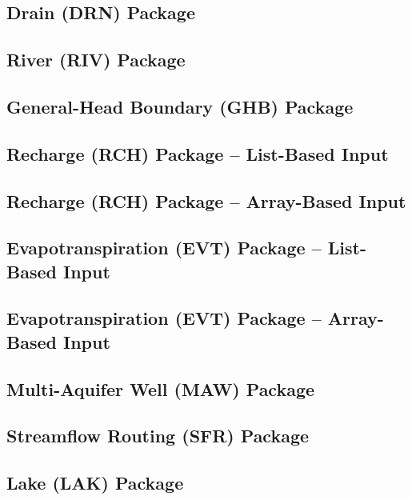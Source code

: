 \newpage
\subsection{Drain (DRN) Package}


\newpage
\subsection{River (RIV) Package}


\newpage
\subsection{General-Head Boundary (GHB) Package}


\newpage
\subsection{Recharge (RCH) Package -- List-Based Input}


\newpage
\subsection{Recharge (RCH) Package -- Array-Based Input}


\newpage
\subsection{Evapotranspiration (EVT) Package -- List-Based Input}


\newpage
\subsection{Evapotranspiration (EVT) Package -- Array-Based Input}


\newpage
\subsection{Multi-Aquifer Well (MAW) Package}


\newpage
\subsection{Streamflow Routing (SFR) Package}


\newpage
\subsection{Lake (LAK) Package}


